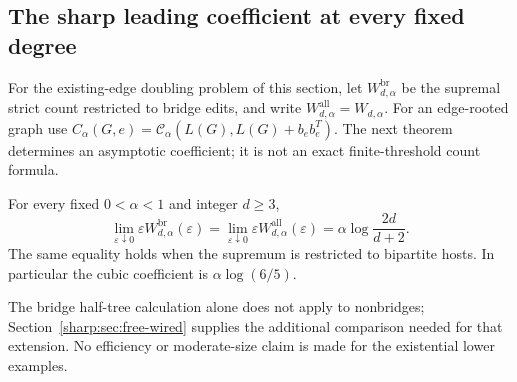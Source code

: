 \subsection{The sharp leading coefficient at every fixed degree}\label{sharp:sec}
For the existing-edge doubling problem of this section, let
$W^{\mathrm{br}}_{d,\alpha}$ be the supremal strict count restricted to
bridge edits, and write $W^{\mathrm{all}}_{d,\alpha}=W_{d,\alpha}$.
For an edge-rooted graph use
$C_\alpha(G,e)=\mathcal C_\alpha(L(G),L(G)+b_eb_e^T)$.
The next theorem determines an asymptotic coefficient; it is not an
exact finite-threshold count formula.

\begin{theorem}\label{sharp:thm:sharp}
For every fixed $0<\alpha<1$ and integer $d\ge3$,
\[
 \lim_{\varepsilon\downarrow0}\varepsilon
               W^{\mathrm{br}}_{d,\alpha}(\varepsilon)
 =\lim_{\varepsilon\downarrow0}\varepsilon
               W^{\mathrm{all}}_{d,\alpha}(\varepsilon)
 =\alpha\log\frac{2d}{d+2}.
\]
The same equality holds when the supremum is restricted to bipartite
hosts. In particular the cubic coefficient is $\alpha\log(6/5)$.
\end{theorem}

The bridge half-tree calculation alone does not apply to nonbridges;
Section~\ref{sharp:sec:free-wired} supplies the additional comparison needed
for that extension. No efficiency or moderate-size claim is made for
the existential lower examples.

